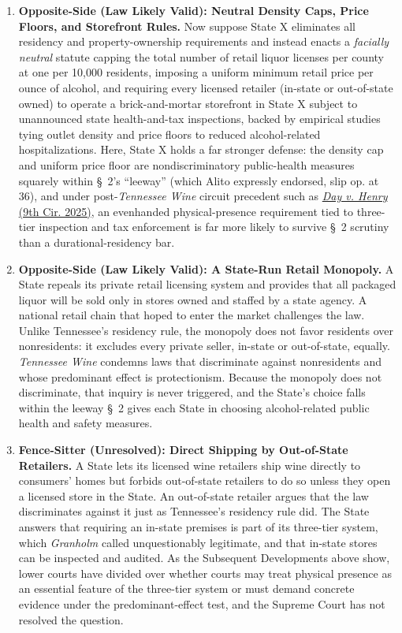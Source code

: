\documentclass[12pt]{article}
\begin{document}
\begin{enumerate}
\item \textbf{Opposite-Side (Law Likely Valid): Neutral Density Caps, Price Floors, and Storefront Rules.} Now suppose State X eliminates all residency and property-ownership requirements and instead enacts a \textit{facially neutral} statute capping the total number of retail liquor licenses per county at one per 10,000 residents, imposing a uniform minimum retail price per ounce of alcohol, and requiring every licensed retailer (in-state or out-of-state owned) to operate a brick-and-mortar storefront in State X subject to unannounced state health-and-tax inspections, backed by empirical studies tying outlet density and price floors to reduced alcohol-related hospitalizations. Here, State X holds a far stronger defense: the density cap and uniform price floor are nondiscriminatory public-health measures squarely within \S~2's ``leeway'' (which Alito expressly endorsed, slip op. at 36), and under post-\textit{Tennessee Wine} circuit precedent such as \href{https://cdn.ca9.uscourts.gov/datastore/opinions/2025/09/05/23-16148.pdf}{\textit{Day v. Henry} (9th Cir. 2025)}, an evenhanded physical-presence requirement tied to three-tier inspection and tax enforcement is far more likely to survive \S~2 scrutiny than a durational-residency bar.

\item \textbf{Opposite-Side (Law Likely Valid): A State-Run Retail Monopoly.} A State repeals its private retail licensing system and provides that all packaged liquor will be sold only in stores owned and staffed by a state agency. A national retail chain that hoped to enter the market challenges the law. Unlike Tennessee's residency rule, the monopoly does not favor residents over nonresidents: it excludes every private seller, in-state or out-of-state, equally. \textit{Tennessee Wine} condemns laws that discriminate against nonresidents and whose predominant effect is protectionism. Because the monopoly does not discriminate, that inquiry is never triggered, and the State's choice falls within the leeway \S~2 gives each State in choosing alcohol-related public health and safety measures.

\item \textbf{Fence-Sitter (Unresolved): Direct Shipping by Out-of-State Retailers.} A State lets its licensed wine retailers ship wine directly to consumers' homes but forbids out-of-state retailers to do so unless they open a licensed store in the State. An out-of-state retailer argues that the law discriminates against it just as Tennessee's residency rule did. The State answers that requiring an in-state premises is part of its three-tier system, which \textit{Granholm} called unquestionably legitimate, and that in-state stores can be inspected and audited. As the Subsequent Developments above show, lower courts have divided over whether courts may treat physical presence as an essential feature of the three-tier system or must demand concrete evidence under the predominant-effect test, and the Supreme Court has not resolved the question.

\end{enumerate}
\end{document}
